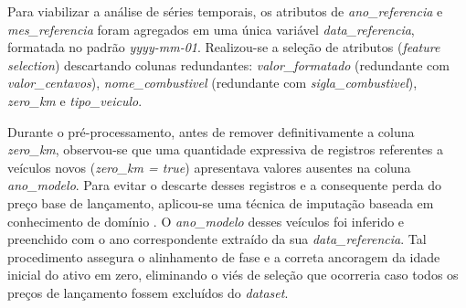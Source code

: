 Para viabilizar a análise de séries temporais, os atributos de \textit{ano\_referencia} e \textit{mes\_referencia} foram agregados em uma única variável \textit{data\_referencia}, formatada no padrão \textit{yyyy-mm-01}. Realizou-se a seleção de atributos (\textit{feature selection}) descartando colunas redundantes: \textit{valor\_formatado} (redundante com \textit{valor\_centavos}), \textit{nome\_combustivel} (redundante com \textit{sigla\_combustivel}), \textit{zero\_km} e \textit{tipo\_veiculo}.

Durante o pré-processamento, antes de remover definitivamente a coluna \textit{zero\_km}, observou-se que uma quantidade expressiva de registros referentes a veículos novos (\textit{zero\_km = true}) apresentava valores ausentes na coluna \textit{ano\_modelo}. Para evitar o descarte desses registros e a consequente perda do preço base de lançamento, aplicou-se uma técnica de imputação baseada em conhecimento de domínio \cite{tan2019introduction}. O \textit{ano\_modelo} desses veículos foi inferido e preenchido com o ano correspondente extraído da sua \textit{data\_referencia}. Tal procedimento assegura o alinhamento de fase e a correta ancoragem da idade inicial do ativo em zero, eliminando o viés de seleção que ocorreria caso todos os preços de lançamento fossem excluídos do \textit{dataset}.
